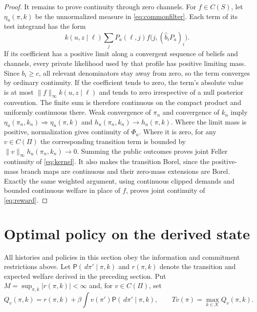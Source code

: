 \documentclass[11pt,a4paper]{article}
\newcommand{\cK}{\mathcal K}
\newcommand{\dd}{\,d}
\begin{document}
\begin{proof}
It remains to prove continuity through zero channels. For $f\in C(S)$,
let $\eta_u(\pi,k)$ be the unnormalized measure in
\eqref{eq:commonfilter}. Each term of its test integrand has the form
\[
 k(u,z\mid\ell)\sum_jP_a(\ell,j)
           f\bigl(j,(\widehat b_iP_a)_i\bigr).
\]
If its coefficient has a positive limit along a convergent sequence of
beliefs and channels, every private likelihood used by that profile has
positive limiting mass. Since $b_i\geq c$, all relevant denominators stay
away from zero, so the term converges by ordinary continuity. If the
coefficient tends to zero, the term's absolute value is at most
$\|f\|_\infty k(u,z\mid\ell)$ and tends to zero irrespective of a null
posterior convention. The finite sum is therefore continuous on the compact
product and uniformly continuous there. Weak convergence of $\pi_n$ and
convergence of $k_n$ imply
$\eta_u(\pi_n,k_n)\Rightarrow\eta_u(\pi,k)$ and $h_u(\pi_n,k_n)\to h_u(\pi,k)$.
Where the limit mass is positive, normalization gives continuity of $\Phi_u$.
Where it is zero, for any $v\in C(\Pi)$ the corresponding transition term
is bounded by $\|v\|_\infty h_u(\pi_n,k_n)\to0$. Summing the public
outcomes proves joint Feller continuity of \eqref{eq:kernel}. It also makes
the transition Borel, since the positive-mass branch maps are continuous and
their zero-mass extensions are Borel. Exactly the same weighted argument,
using continuous clipped demands and bounded continuous welfare in place of
$f$, proves joint continuity of \eqref{eq:reward}.
\end{proof}

\section{Optimal policy on the derived state}
All histories and policies in this section obey the information and commitment
restrictions above. Let $\mathsf P(\dd\pi'\mid\pi,k)$ and $r(\pi,k)$ denote
the transition and expected welfare derived in the preceding section. Put
$M=\sup_{\pi,k}|r(\pi,k)|<\infty$ and, for $v\in C(\Pi)$, set
\begin{equation}\label{eq:bellman}
 Q_v(\pi,k)=r(\pi,k)+\beta\int v(\pi')\mathsf P(\dd\pi'\mid\pi,k),
 \qquad Tv(\pi)=\max_{k\in\cK}Q_v(\pi,k).
\end{equation}
\end{document}
